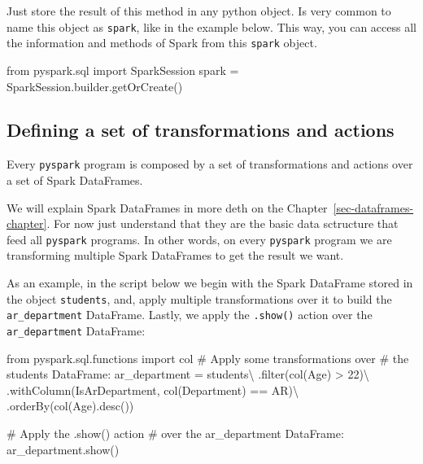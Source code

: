 \documentclass[
  11pt,
  letterpaper,
  DIV=11,
  numbers=noendperiod]{scrreprt}
\newenvironment{Shaded}{\begin{snugshade}}{\end{snugshade}}
\newcommand{\BuiltInTok}[1]{\textcolor[rgb]{0.00,0.23,0.31}{#1}}
\newcommand{\CommentTok}[1]{\textcolor[rgb]{0.37,0.37,0.37}{#1}}
\newcommand{\DecValTok}[1]{\textcolor[rgb]{0.68,0.00,0.00}{#1}}
\newcommand{\ImportTok}[1]{\textcolor[rgb]{0.00,0.46,0.62}{#1}}
\newcommand{\NormalTok}[1]{\textcolor[rgb]{0.00,0.23,0.31}{#1}}
\newcommand{\OperatorTok}[1]{\textcolor[rgb]{0.37,0.37,0.37}{#1}}
\newcommand{\StringTok}[1]{\textcolor[rgb]{0.13,0.47,0.30}{#1}}
\begin{document}
Just store the result of this method in any python object. Is very
common to name this object as \texttt{spark}, like in the example below.
This way, you can access all the information and methods of Spark from
this \texttt{spark} object.

\begin{Shaded}
\begin{Highlighting}[]
\ImportTok{from}\NormalTok{ pyspark.sql }\ImportTok{import}\NormalTok{ SparkSession}
\NormalTok{spark }\OperatorTok{=}\NormalTok{ SparkSession.builder.getOrCreate()}
\end{Highlighting}
\end{Shaded}

\hypertarget{defining-a-set-of-transformations-and-actions}{%
\subsection{Defining a set of transformations and
actions}\label{defining-a-set-of-transformations-and-actions}}

Every \texttt{pyspark} program is composed by a set of transformations
and actions over a set of Spark DataFrames.

We will explain Spark DataFrames in more deth on the
Chapter~\ref{sec-dataframes-chapter}. For now just understand that they
are the basic data sctructure that feed all \texttt{pyspark} programs.
In other words, on every \texttt{pyspark} program we are transforming
multiple Spark DataFrames to get the result we want.

As an example, in the script below we begin with the Spark DataFrame
stored in the object \texttt{students}, and, apply multiple
transformations over it to build the \texttt{ar\_department} DataFrame.
Lastly, we apply the \texttt{.show()} action over the
\texttt{ar\_department} DataFrame:

\begin{Shaded}
\begin{Highlighting}[]
\ImportTok{from}\NormalTok{ pyspark.sql.functions }\ImportTok{import}\NormalTok{ col}
\CommentTok{\# Apply some transformations over}
\CommentTok{\# the \textasciigrave{}students\textasciigrave{} DataFrame:}
\NormalTok{ar\_department }\OperatorTok{=}\NormalTok{ students}\OperatorTok{\textbackslash{}}
\NormalTok{  .}\BuiltInTok{filter}\NormalTok{(col(}\StringTok{\textquotesingle{}Age\textquotesingle{}}\NormalTok{) }\OperatorTok{\textgreater{}} \DecValTok{22}\NormalTok{)}\OperatorTok{\textbackslash{}}
\NormalTok{  .withColumn(}\StringTok{\textquotesingle{}IsArDepartment\textquotesingle{}}\NormalTok{, col(}\StringTok{\textquotesingle{}Department\textquotesingle{}}\NormalTok{) }\OperatorTok{==} \StringTok{\textquotesingle{}AR\textquotesingle{}}\NormalTok{)}\OperatorTok{\textbackslash{}}
\NormalTok{  .orderBy(col(}\StringTok{\textquotesingle{}Age\textquotesingle{}}\NormalTok{).desc())}
  
  
\CommentTok{\# Apply the \textasciigrave{}.show()\textasciigrave{} action}
\CommentTok{\# over the \textasciigrave{}ar\_department\textasciigrave{} DataFrame:}
\NormalTok{ar\_department.show()}
\end{Highlighting}
\end{Shaded}
\end{document}
